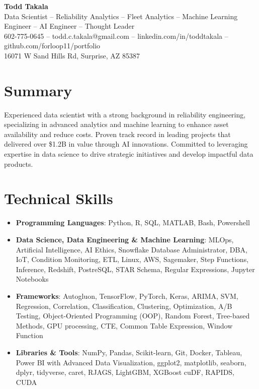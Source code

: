 \documentclass[letterpaper,10pt]{article}
\newcommand{\resumeItem}[1]{\item\small{#1}}
\newcommand{\resumeSubHeadingList}{\begin{itemize}[leftmargin=0.15in, label={}]}
\newcommand{\resumeSubHeadingListEnd}{\end{itemize}}
\begin{document}
\begin{center}
  \textbf{\Huge Todd Takala} \\
  \small Data Scientist -- Reliability Analytics -- Fleet Analytics -- Machine Learning Engineer -- AI Engineer -- Thought Leader \\
  \small 602-775-0645 -- todd.c.takala@gmail.com -- 
  linkedin.com/in/toddtakala --
  github.com/forloop11/portfolio \\
  \small 16071 W Sand Hills Rd, Surprise, AZ 85387
\end{center}

\section*{Summary}
Experienced data scientist with a strong background in reliability engineering, specializing in advanced analytics and machine learning to enhance asset availability and reduce costs. Proven track record in leading projects that delivered over \$1.2B in value through AI innovations. Committed to leveraging expertise in data science to drive strategic initiatives and develop impactful data products.

\section{Technical Skills}
    \resumeSubHeadingList
        
        \resumeItem{\textbf{Programming Languages}: Python, R, SQL, MATLAB, Bash, Powershell}
        
        \resumeItem{\textbf{Data Science, Data Engineering \& Machine Learning}: MLOps, Artificial Intelligence, AI Ethics, Snowflake Database Administrator, DBA, IoT, Condition Monitoring, ETL, Linux, AWS, Sagemaker, Step Functions, Inference, Redshift, PostreSQL, STAR Schema, Regular Expressions, Jupyter Notebooks}
        
        \resumeItem{\textbf{Frameworks}: Autogluon, TensorFlow, PyTorch, Keras, ARIMA, SVM, Regression, Correlation, Classification, Clustering, Optimization, A/B Testing, Object-Oriented Programming (OOP), Random Forest, Tree-based Methods, GPU processing, CTE, Common Table Expression, Window Function}
        
        \resumeItem{\textbf{Libraries \& Tools}: NumPy, Pandas, Scikit-learn, Git, Docker, Tableau, Power BI with Advanced Data Visualization, ggplot2, matplotlib, seaborn, dplyr, tidyverse, caret, RJAGS, LightGBM, XGBoost cuDF, RAPIDS, CUDA}
\resumeSubHeadingListEnd
\end{document}
